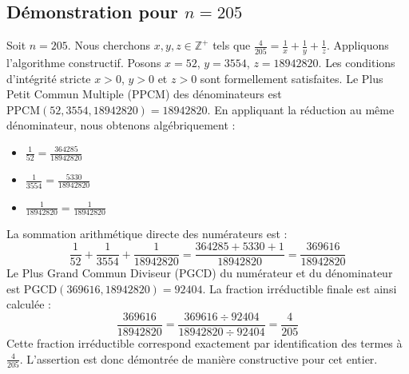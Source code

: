 \documentclass[11pt,a4paper]{article}
\begin{document}
\subsection{Démonstration pour $n = 205$}
Soit $n = 205$. Nous cherchons $x, y, z \in \mathbb{Z}^{+}$ tels que $\frac{4}{205} = \frac{1}{x} + \frac{1}{y} + \frac{1}{z}$.
Appliquons l'algorithme constructif. Posons $x = 52$, $y = 3554$, $z = 18942820$.
Les conditions d'intégrité stricte $x > 0$, $y > 0$ et $z > 0$ sont formellement satisfaites.
Le Plus Petit Commun Multiple (PPCM) des dénominateurs est $\text{PPCM}(52, 3554, 18942820) = 18942820$.
En appliquant la réduction au même dénominateur, nous obtenons algébriquement :
\begin{itemize}
    \item $\frac{1}{52} = \frac{364285}{18942820}$
    \item $\frac{1}{3554} = \frac{5330}{18942820}$
    \item $\frac{1}{18942820} = \frac{1}{18942820}$
\end{itemize}
La sommation arithmétique directe des numérateurs est :
$$ \frac{1}{52} + \frac{1}{3554} + \frac{1}{18942820} = \frac{364285 + 5330 + 1}{18942820} = \frac{369616}{18942820} $$
Le Plus Grand Commun Diviseur (PGCD) du numérateur et du dénominateur est $\text{PGCD}(369616, 18942820) = 92404$.
La fraction irréductible finale est ainsi calculée :
$$ \frac{369616}{18942820} = \frac{369616 \div 92404}{18942820 \div 92404} = \frac{4}{205} $$
Cette fraction irréductible correspond exactement par identification des termes à $\frac{4}{205}$. L'assertion est donc démontrée de manière constructive pour cet entier.
\end{document}
